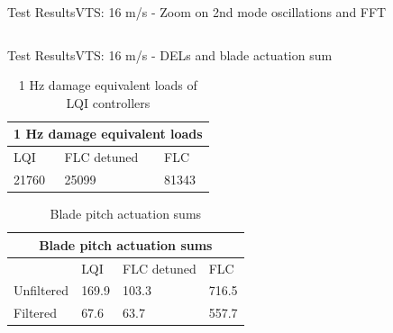 \begin{frame}{Test Results}{VTS: 16 m/s - Zoom on 2nd mode oscillations and FFT}
\begin{columns}
	\end{columns}
	
	
	

\end{frame}



\begin{frame}{Test Results}{VTS: 16 m/s - DELs and blade actuation sum}
	\begin{table}[t]
		\centering
		\caption{1 Hz damage equivalent loads of LQI controllers}
		\label{tab:del}
		\begin{tabular}{@{}|lll|@{}}
			\toprule
			\multicolumn{3}{|c|}{1 Hz damage equivalent loads}                                                                     \\ \midrule
			\multicolumn{1}{|l|}{LQI}                           & \multicolumn{1}{l|}{FLC detuned} & FLC                           \\ \midrule
			\multicolumn{1}{|l|}{\cellcolor[HTML]{9AFF99}21760} & \multicolumn{1}{l|}{25099}       & \cellcolor[HTML]{FFCCC9}81343 \\ \bottomrule
		\end{tabular}
	\end{table}
	
	\begin{table}[t]
		\centering
		\caption{Blade pitch actuation sums}
		\label{tab:pitch_sum}
		\begin{tabular}{@{}|llll|@{}}
			\toprule
			\multicolumn{4}{|c|}{Blade pitch actuation sums}                                                                                                   \\ \midrule
			\multicolumn{1}{|l|}{}           & \multicolumn{1}{l|}{LQI}   & \multicolumn{1}{l|}{FLC detuned}                   & FLC                           \\ \midrule
			\multicolumn{1}{|l|}{Unfiltered} & \multicolumn{1}{l|}{169.9} & \multicolumn{1}{l|}{\cellcolor[HTML]{9AFF99}103.3} & \cellcolor[HTML]{FFCCC9}716.5 \\ \midrule
			\multicolumn{1}{|l|}{Filtered}   & \multicolumn{1}{l|}{67.6}  & \multicolumn{1}{l|}{\cellcolor[HTML]{9AFF99}63.7}  & \cellcolor[HTML]{FFCCC9}557.7 \\ \bottomrule
		\end{tabular}
	\end{table}
\end{frame}


